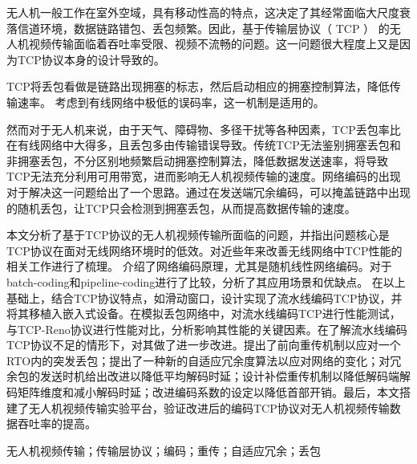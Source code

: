\cabstract
{
	无人机一般工作在室外空域，具有移动性高的特点，这决定了其经常面临大尺度衰落信道环境，数据链路错包、丢包频繁。因此，基于传输层协议（ TCP ） 的无人机视频传输面临着吞吐率受限、视频不流畅的问题。这一问题很大程度上又是因为TCP协议本身的设计导致的。
	\par
	TCP将丢包看做是链路出现拥塞的标志，然后启动相应的拥塞控制算法，降低传输速率。
	考虑到有线网络中极低的误码率，这一机制是适用的。
	\par
	然而对于无人机来说，由于天气、障碍物、多径干扰等各种因素，TCP丢包率比在有线网络中大得多，且丢包多由传输错误导致。传统TCP无法鉴别拥塞丢包和非拥塞丢包，不分区别地频繁启动拥塞控制算法，降低数据发送速率，将导致TCP无法充分利用可用带宽，进而影响无人机视频传输的速度。网络编码的出现对于解决这一问题给出了一个思路。通过在发送端冗余编码，可以掩盖链路中出现的随机丢包，让TCP只会检测到拥塞丢包，从而提高数据传输的速度。
	\par
	本文分析了基于TCP协议的无人机视频传输所面临的问题，并指出问题核心是TCP协议在面对无线网络环境时的低效。对近些年来改善无线网络中TCP性能的相关工作进行了梳理。
	介绍了网络编码原理，尤其是随机线性网络编码。对于batch-coding和pipeline-coding进行了比较，分析了其应用场景和优缺点。
	在以上基础上，结合TCP协议特点，如滑动窗口，设计实现了流水线编码TCP协议，并将其移植入嵌入式设备。在模拟丢包网络中，对流水线编码TCP进行性能测试，与TCP-Reno协议进行性能对比，分析影响其性能的关键因素。在了解流水线编码TCP协议不足的情形下，对其做了进一步改进。提出了前向重传机制以应对一个RTO内的突发丢包；提出了一种新的自适应冗余度算法以应对网络的变化；对冗余包的发送时机给出改进以降低平均解码时延；设计补偿重传机制以降低解码端解码矩阵维度和减小解码时延；改进编码系数的设定以降低首部开销。最后，本文搭建了无人机视频传输实验平台，验证改进后的编码TCP协议对无人机视频传输数据吞吐率的提高。
	\par
	
}
{无人机视频传输；传输层协议；编码；重传；自适应冗余；丢包} 	%